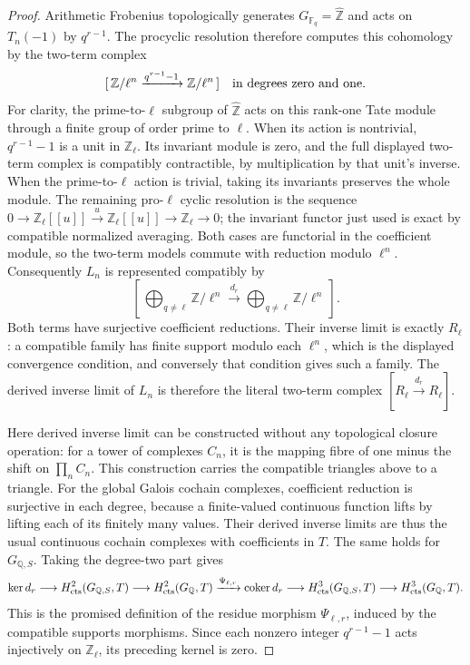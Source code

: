 \begin{proof}
Arithmetic Frobenius topologically generates
\(G_{\mathbb F_q}=\widehat{\mathbb Z}\) and acts on
\(T_n(-1)\) by \(q^{r-1}\). The procyclic resolution
therefore computes this cohomology by the two-term complex
\[
 [\,\mathbb Z/\ell^n
          \xrightarrow{q^{r-1}-1}\mathbb Z/\ell^n\,]
                     \quad\hbox{in degrees zero and one}.
\]
For clarity, the prime-to-\(\ell\) subgroup of
\(\widehat{\mathbb Z}\) acts on this rank-one Tate
module through a finite group of order prime to \(\ell\).
When its action is nontrivial, \(q^{r-1}-1\) is a unit
in \(\mathbb Z_\ell\). Its invariant module is zero,
and the full displayed two-term complex is compatibly
contractible, by multiplication by that unit's inverse.
When the prime-to-\(\ell\) action is trivial, taking
its invariants preserves the whole module. The remaining
pro-\(\ell\) cyclic resolution is the sequence
\(0\to\mathbb Z_\ell[[u]]\xrightarrow{u}
\mathbb Z_\ell[[u]]\to\mathbb Z_\ell\to0\);
the invariant functor just used is exact by compatible
normalized averaging. Both cases are functorial in the
coefficient module, so the two-term models commute with
reduction modulo \(\ell^n\). Consequently \(L_n\) is
represented compatibly by
\[
 [\,\bigoplus_{q\ne\ell}\mathbb Z/\ell^n
       \xrightarrow{d_r}\bigoplus_{q\ne\ell}\mathbb Z/\ell^n\,].
\]
Both terms have surjective coefficient reductions. Their
inverse limit is exactly \(R_\ell\): a compatible family
has finite support modulo each \(\ell^n\), which is the
displayed convergence condition, and conversely that
condition gives such a family. The derived inverse limit
of \(L_n\) is therefore the literal two-term complex
\([R_\ell\xrightarrow{d_r}R_\ell]\).

Here derived inverse limit can be constructed without any
topological closure operation: for a tower of complexes
\(C_n\), it is the mapping fibre of one minus the shift on
\(\prod_n C_n\). This construction carries the compatible
triangles above to a triangle. For the global Galois
cochain complexes, coefficient reduction is surjective in
each degree, because a finite-valued continuous function
lifts by lifting each of its finitely many values.
Their derived inverse limits are thus the usual continuous
cochain complexes with coefficients in \(T\). The same
holds for \(G_{\mathbb Q,S}\). Taking the degree-two
part gives
\[
 \ker d_r\longrightarrow H^2_{\rm cts}(G_{\mathbb Q,S},T)
 \longrightarrow H^2_{\rm cts}(G_{\mathbb Q},T)
 \xrightarrow{\Psi_{\ell,r}}\operatorname{coker}d_r
 \longrightarrow H^3_{\rm cts}(G_{\mathbb Q,S},T)
 \longrightarrow H^3_{\rm cts}(G_{\mathbb Q},T).
\]
This is the promised definition of the residue morphism
\(\Psi_{\ell,r}\), induced by the compatible supports
morphisms. Since each nonzero integer \(q^{r-1}-1\)
acts injectively on \(\mathbb Z_\ell\), its preceding
kernel is zero.


\end{proof}
